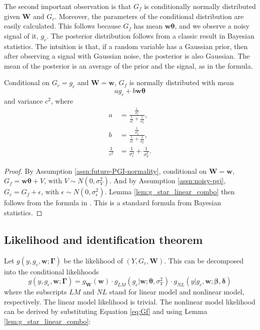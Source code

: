 \documentclass[12pt]{article}
\begin{document}
The second important observation is that $G_f$ is conditionally normally distributed given $\boldsymbol W$ and $G_c$. Moreover, the parameters of the conditional distribution are easily calculated. This follows because $G_f$ has mean $\boldsymbol w \boldsymbol \theta$, and we observe a noisy signal of it, $g_c$. The posterior distribution follows from a classic result in Bayesian statistics. The intuition is that, if a random variable has a Gaussian prior, then after observing a signal with Gaussian noise, the posterior is also Gaussian. The mean of the posterior is an average of the prior and the signal, as in the formula.

\begin{lemma}\label{lem:g_star_linear_combo} Conditional on $G_c = g_c$ and $\boldsymbol{W} = \boldsymbol{w}$, $G_f$ is normally distributed with mean
    \[
    a g_c + b \boldsymbol{w} \boldsymbol{\theta}
    \]
    and variance $c^2$, where
    \begin{align*}
    a & =\frac{\frac{1}{\sigma_{\epsilon}^{2}}} {\frac{1}{\sigma^2_{\epsilon}} + \frac{1}{\sigma^2_V}}\text{,} \\
    b & =\frac{\frac{1}{\sigma_{V}^{2}}} {\frac{1}{\sigma^2_{\epsilon}} + \frac{1}{\sigma^2_V}}\text{,} \\
    \frac{1}{c^2} & = \frac{1}{\sigma^2_{\epsilon}} + \frac{1}{\sigma^2_V} \text{.}
    \end{align*} 
\end{lemma}

\begin{proof}
By Assumption \ref{assn:future-PGI-normality}, conditional on
$\boldsymbol{W}=\boldsymbol{w}$, $G_f = \boldsymbol{w}\boldsymbol{\theta} + V$, with $V \sim N(0,\sigma_{V}^{2})$. And by Assumption \ref{assn:noisy-pgi}, $G_c = G_f + \epsilon$, with $\epsilon\sim N(0,\sigma_{\epsilon}^{2})$. Lemma \ref{lem:g_star_linear_combo} then follows from the formula in \textcite[p. 40, Equation 2.10]{gelman2013bayesian}. This is a standard formula from Bayesian statistics.
\end{proof}


\subsection{Likelihood and identification theorem}
Let $g(y, g_c, \boldsymbol w ; \boldsymbol \Gamma)$ be the likelihood of $(Y, G_c, \boldsymbol W)$. This can be decomposed into the conditional likelihoods
\begin{equation}
    \label{eq:likelihood}    
    g(y, g_c, \boldsymbol w ; \boldsymbol \Gamma) =
    g _{\boldsymbol W} (\boldsymbol w) \cdot
    g_{LM}(g_c | \boldsymbol w ; \boldsymbol \theta, \sigma^2_V) \cdot
    g_{NL}(y | g_c, \boldsymbol w; \boldsymbol \beta, \boldsymbol \delta)
\end{equation}
where the subscripts $LM$ and $NL$ stand for linear model and nonlinear model, respectively. The linear model likelihood is trivial. The nonlinear model likelihood can be derived by substituting Equation \ref{eq:Gf} and using Lemma \ref{lem:g_star_linear_combo}:
\end{document}
